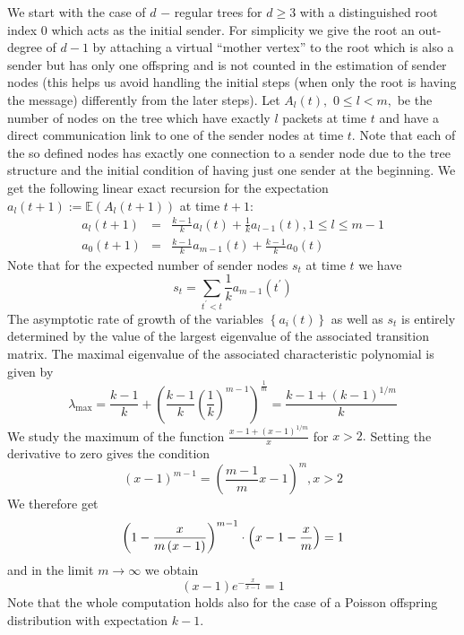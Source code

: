 We start with the case of $d$ $-$ regular trees for $d\geq 3$ with a
distinguished root index $0$ which acts as the initial sender. For
simplicity we give the root an out-degree of $d-1$ by attaching a virtual
``mother vertex'' to the root which is also a sender but has only one
offspring and is not counted in the estimation of sender nodes (this helps us avoid
handling the initial steps (when only the root is having the message)
differently from the later steps). Let $A_{l}\left( t\right) ,$ $0\leq l<m,$
be the number of nodes on the tree which have exactly $l$ packets at time $t
$ and have a direct communication link to one of the sender nodes at time $t$. Note that each of the so defined nodes has exactly one connection to a
sender node due to the tree structure and the initial condition of having
just one sender at the beginning. We get the following linear exact
recursion for the expectation $a_{l}\left( t+1\right) :=\mathbb{E}\left(
A_{l}\left( t+1\right) \right) $ at time $t+1:$%
\begin{eqnarray*}
a_{l}\left( t+1\right)  &=&\frac{k-1}{k}a_{l}\left( t\right) +\frac{1}{k}%
a_{l-1}\left( t\right) ,1\leq l\leq m-1 \\
a_{0}\left( t+1\right)  &=&\frac{k-1}{k}a_{m-1}\left( t\right) +\frac{k-1}{k}%
a_{0}\left( t\right) 
\end{eqnarray*}%
Note that for the expected number of sender nodes $s_{t}$ at time $t$ we
have 
\[
s_{t}=\sum\limits_{t^{\prime }<t}\frac{1}{k}a_{m-1}\left( t^{\prime }\right) 
\]
The asymptotic rate of growth of the variables $\left\{ a_{i}\left( t\right)
\right\} $ as well as $s_{t}$ is entirely determined by the value of the
largest eigenvalue of the associated transition matrix. The maximal
eigenvalue of the associated characteristic polynomial is given by 
\[
\lambda _{\max }=\frac{k-1}{k}+\left( \frac{k-1}{k}\left( \frac{1}{k}\right)
^{m-1}\right) ^{\frac{1}{m}}=\frac{k-1+\left( k-1\right) ^{1/m}}{k}
\]%
We study the maximum of the function $\frac{x-1+\left( x-1\right) ^{1/m}}{x}$
for $x>2.$ Setting the derivative to zero gives the condition 
\[
\left( x-1\right) ^{m-1}=\left( \frac{m-1}{m}x-1\right) ^{m},x>2
\]%
We therefore get
\[
\left( 1-\frac{x}{m\left( x-1\right) }\right) ^{m-1}\cdot \left( x-1-\frac{%
x}{m}\right)=1 
\]%
and in the limit $m\rightarrow \infty $ we obtain%
\[
\left( x-1\right) e^{-\frac{x}{x-1}}=1
\]%
Note that the whole computation holds also for the case of a Poisson
offspring distribution with expectation $k-1.$
\medskip